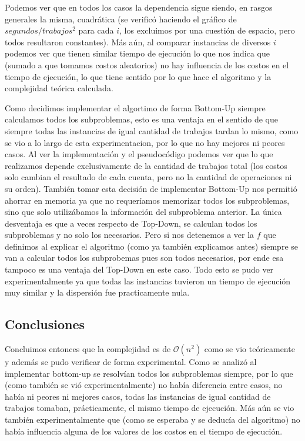 \documentclass[A4paper,oneside,fleqn,11pt]{article}
\theoremstyle{definition}
\begin{document}
Podemos ver que en todos los casos la dependencia sigue siendo, en rasgos generales la misma, cuadrática (se verificó haciendo el gráfico de $segundos / trabajos^2$ para cada $i$, los excluimos por una cuestión de espacio, pero todos resultaron constantes). Más aún, al comparar instancias de diversos $i$ podemos ver que tienen similar tiempo de ejecución lo que nos indica que (sumado a que tomamos costos aleatorios) no hay influencia de los costos en el tiempo de ejecución, lo que tiene sentido por lo que hace el algoritmo y la complejidad teórica calculada.


Como decidimos implementar el algortimo de forma Bottom-Up siempre calculamos todos los subproblemas, esto es una ventaja en el sentido de que siempre todas las instancias de igual cantidad de trabajos tardan lo mismo, como se vio a lo largo de esta experimentacion, por lo que no hay mejores ni peores casos. Al ver la implementación y el pseudocódigo podemos ver que lo que realizamos depende exclusivamente de la cantidad de trabajos total (los costos solo cambian el resultado de cada cuenta, pero no la cantidad de operaciones ni su orden). También tomar esta decisión de implementar Bottom-Up nos permitió ahorrar en memoria ya que no requeríamos memorizar todos los subproblemas, sino que solo utilizábamos la información del subproblema anterior. La única desventaja es que a veces respecto de Top-Down, se calculan todos los subproblemas y no solo los necesarios. Pero si nos detenemos a ver la $f$ que definimos al explicar el algoritmo (como ya también explicamos antes) siempre se van a calcular todos los subprobemas pues son todos necesarios, por ende esa tampoco es una ventaja del Top-Down en este caso. Todo esto se pudo ver experimentalmente ya que todas las instancias tuvieron un tiempo de ejecución muy similar y la dispersión fue practicamente nula.

\subsection{Conclusiones}

Concluimos entonces que la complejidad es de $\mathcal{O}(n^2)$ como se vio teóricamente y además se pudo verificar de forma experimental. Como se analizó al implementar bottom-up se resolvían todos los subproblemas siempre, por lo que (como también se vió experimentalmente) no había diferencia entre casos, no había ni peores ni mejores casos, todas las instancias de igual cantidad de trabajos tomaban, prácticamente, el mismo tiempo de ejecución. Más aún se vio también experimentalmente que (como se esperaba y se deducía del algoritmo) no había influencia alguna de los valores de los costos en el tiempo de ejecución.
\end{document}
